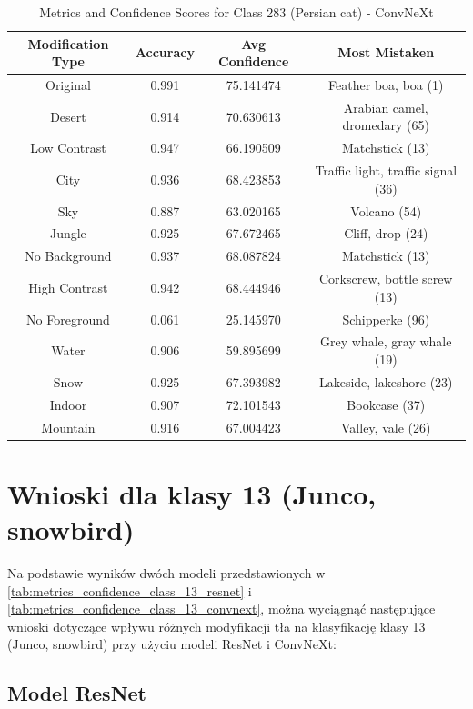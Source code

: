\begin{table}
	\centering
	\begin{tabular}{|c|c|c|c|}
		\hline
		\textbf{Modification Type} & \textbf{Accuracy} & \textbf{Avg Confidence} & \textbf{Most Mistaken} \\
		\hline
		Original & 0.991 & 75.141474 & Feather boa, boa (1) \\
		\hline
		Desert & 0.914 & 70.630613 & Arabian camel, dromedary (65) \\
		\hline
		Low Contrast & 0.947 & 66.190509 & Matchstick (13) \\
		\hline
		City & 0.936 & 68.423853 & Traffic light, traffic signal (36) \\
		\hline
		Sky & 0.887 & 63.020165 & Volcano (54) \\
		\hline
		Jungle & 0.925 & 67.672465 & Cliff, drop (24) \\
		\hline
		No Background & 0.937 & 68.087824 & Matchstick (13) \\
		\hline
		High Contrast & 0.942 & 68.444946 & Corkscrew, bottle screw (13) \\
		\hline
		No Foreground & 0.061 & 25.145970 & Schipperke (96) \\
		\hline
		Water & 0.906 & 59.895699 & Grey whale, gray whale (19) \\
		\hline
		Snow & 0.925 & 67.393982 & Lakeside, lakeshore (23) \\
		\hline
		Indoor & 0.907 & 72.101543 & Bookcase (37) \\
		\hline
		Mountain & 0.916 & 67.004423 & Valley, vale (26) \\
		\hline
	\end{tabular}
	\caption{Metrics and Confidence Scores for Class 283 (Persian cat) - ConvNeXt}
	\label{tab:metrics_confidence_class_283_convnext}
\end{table}

\section*{Wnioski dla klasy 13 (Junco, snowbird)}

Na podstawie wyników dwóch modeli przedstawionych w \ref*{tab:metrics_confidence_class_13_resnet} i \ref*{tab:metrics_confidence_class_13_convnext}, można wyciągnąć następujące wnioski dotyczące wpływu różnych 
modyfikacji tła na klasyfikację klasy 13 (Junco, snowbird) przy użyciu modeli ResNet i ConvNeXt:

\subsection*{Model ResNet}

